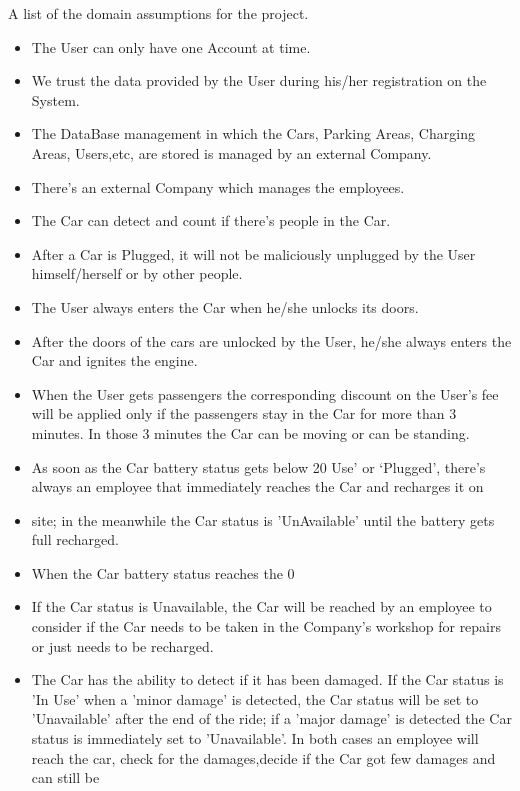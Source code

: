 A list of the domain assumptions for the project.
\begin{itemize}
	\item The User can only have one Account at time.
	\item 	We trust the data provided by the User during his/her registration on the System.
	\item The DataBase management in which the Cars, Parking Areas, Charging Areas, Users,etc, are stored is managed by an external Company.
	\item There's an external Company which manages the employees.
	\item 	The Car can detect and count if there’s people in the Car.
	\item After a Car is Plugged, it will not be maliciously unplugged by the User himself/herself or by other people.
	\item The User always enters the Car when he/she unlocks its doors.
	\item 	After the doors of the cars are unlocked by the User, he/she always enters the Car and ignites the engine.
	\item 	When the User gets passengers the corresponding discount on the User’s fee will be applied only if the passengers stay in the Car for     
  more than 3 minutes. In those 3 minutes the Car can be moving or can be standing.
	\item 	As soon as the Car battery status gets below 20%
  Use’ or ‘Plugged’, there’s always an employee that immediately reaches the Car and recharges it on	
	\item site; in the meanwhile the Car status 
  is 'UnAvailable' until the battery gets full recharged.
	\item When the Car battery status reaches the 0%
	\item If the Car status is Unavailable, the Car will be reached by an employee to consider if the Car needs to be taken in the Company’s         workshop for repairs or just needs to be recharged.
	\item 	The Car has the ability to detect if it has been damaged. If the Car status is 'In Use' when a 'minor damage' is detected, the Car 
  status will be set to 'Unavailable' after the end of the ride; if a 'major damage' is detected the Car status is immediately set to     
  'Unavailable'. In both cases an employee will reach the car, check for the damages,decide if the Car got few damages and can still be  

\end{itemize}
